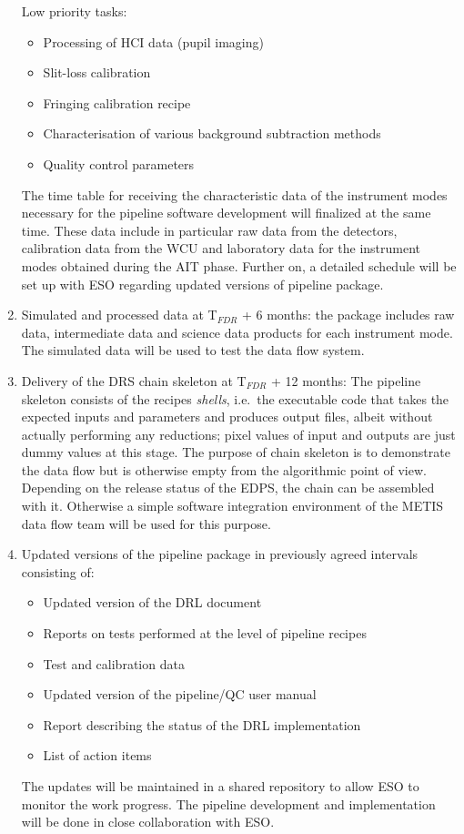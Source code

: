 \begin{enumerate}
    Low priority tasks:
    \begin{itemize}
        \item Processing of \ac{HCI} data (pupil imaging)
        \item Slit-loss calibration
        \item Fringing calibration recipe 
        \item Characterisation of various background subtraction methods
        \item Quality control parameters
    \end{itemize}
    The time table for receiving the characteristic data of the instrument modes necessary for the pipeline software development will finalized at the same time. These data include in particular raw data from the detectors, calibration data from the \ac{WCU} and laboratory data for the instrument modes obtained during the AIT phase. Further on, a detailed schedule will be set up with ESO regarding updated versions of pipeline package.
    
    \item Simulated and processed data at T$_{FDR}$ + 6 months: the package includes raw data, intermediate data and science data products for each instrument mode. The simulated data will be used to test the data flow system.
    
    \item Delivery of the DRS chain skeleton at T$_{FDR}$ + 12 months: The pipeline skeleton consists of the recipes \emph{shells}, i.e.~the executable code that takes the expected inputs and parameters and produces output files, albeit without actually performing any reductions; pixel values of input and outputs are just dummy values at this stage. The purpose of chain skeleton is to demonstrate the data flow but is otherwise empty from the algorithmic point of view. Depending on the release status of the \ac{EDPS}, the chain can be assembled with it. Otherwise a simple software integration environment of the METIS data flow team will be used for this purpose. 

    \item Updated versions of the pipeline package in previously agreed intervals consisting of:
    \begin{itemize}
        \item Updated version of the DRL document
        \item Reports on tests performed at the level of pipeline recipes
        \item Test and calibration data
        \item Updated version of the pipeline/QC user manual
        \item Report describing the status of the DRL implementation
        \item List of action items
    \end{itemize}
    The updates will be maintained in a shared repository to allow ESO to monitor the work progress. The pipeline development and implementation will be done in close collaboration with ESO.
\end{enumerate}


